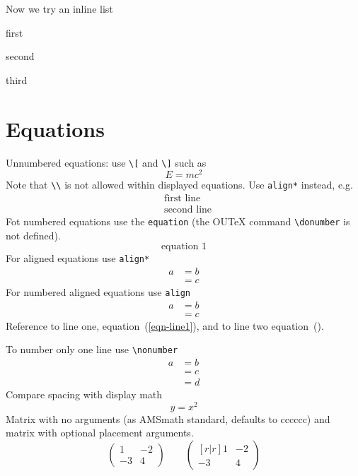 \documentclass[solutionsatend]{ouunit}
\begin{document}
Now we try an inline list
\begin{enumerate*}
\item first 
\item second
\item third
\end{enumerate*}
\section{Equations}
Unnumbered equations: use \verb”\[” and \verb”\]” such as
\[
E=mc^2
\]
Note that \verb”\\” is not allowed within displayed equations. Use \verb"align*" instead, e.g.
\begin{align*}
&\text{first line}\\
&\text{second line}
\end{align*}
Fot numbered equations use the \verb”equation” (the OUTeX command \verb”\donumber” is not defined).
\begin{equation}
\text{equation }1
\end{equation}
For aligned equations use \verb”align*”
\begin{align*}
a& =b\\
&=c
\end{align*}
For numbered aligned equations use \verb”align”
\begin{align}
a& =b\label{eqn-line1}\\
&=c\label{eqn-line2}
\end{align}
Reference to line one, equation~(\ref{eqn-line1}), and to line two equation~().

To number only one line use \verb”\nonumber”
\begin{align}
a& =b\nonumber\\
&=c\label{eqn-middle-line}\\
&=d\nonumber
\end{align}
Compare spacing with display math
\[
y=x^2
\]
Matrix with no arguments (as AMSmath standard, defaults to cccccc) and matrix with optional placement arguments.
\[
\begin{pmatrix}
1 & -2\\
-3 & 4
\end{pmatrix}
\qquad
\begin{pmatrix}[r|r]
1 & -2\\
-3 & 4
\end{pmatrix}
\]
\end{document}
